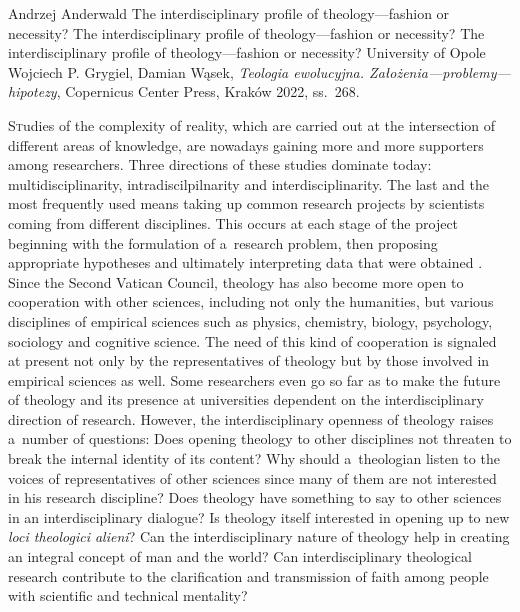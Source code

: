 \begin{newrevengenv}{Andrzej Anderwald}
	{The interdisciplinary profile of theology---fashion or necessity?}
	{The interdisciplinary profile of theology---fashion or necessity?}
	{The interdisciplinary profile of theology---fashion or necessity?}
	{University of Opole}
	{Wojciech P. Grygiel, Damian Wąsek, \textit{Teologia ewolucyjna. Założenia---problemy---hipotezy}, Copernicus Center Press, Kraków 2022, ss.~268.}









\lettrine[loversize=0.13,lines=2,lraise=-0.03,nindent=0em,findent=0.2pt]%
{S}tudies of the complexity of reality, which are carried out at the intersection of different areas of knowledge, are nowadays gaining more and more supporters among researchers. Three directions of these studies dominate today: multidisciplinarity, intradiscilpilnarity and interdisciplinarity. The last and the most frequently used means taking up common research projects by scientists coming from different disciplines. This occurs at each stage of the project beginning with the formulation of a~research problem, then proposing appropriate hypotheses and ultimately interpreting data that were obtained 
\parencite[][]{kasper_interdisziplinaritat_1996}. %
 Since the Second Vatican Council, theology has also become more open to cooperation with other sciences, including not only the humanities, but various disciplines of empirical sciences such as physics, chemistry, biology, psychology, sociology and cognitive science. The need of this kind of cooperation is signaled at present not only by the representatives of theology but by those involved in empirical sciences as well. Some researchers even go so far as to make the future of theology and its presence at universities dependent on the interdisciplinary direction of research. However, the interdisciplinary openness of theology raises a~number of questions: Does opening theology to other disciplines not threaten to break the internal identity of its content? Why should a~theologian listen to the voices of representatives of other sciences since many of them are not interested in his research discipline? Does theology have something to say to other sciences in an interdisciplinary dialogue? Is theology itself interested in opening up to new \textit{loci theologici alieni}? Can the interdisciplinary nature of theology help in creating an integral concept of man and the world? Can interdisciplinary theological research contribute to the clarification and transmission of faith among people with scientific and technical mentality?




\end{newrevengenv}
